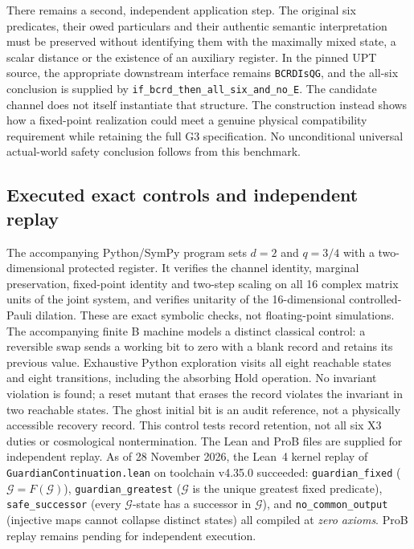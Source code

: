 \documentclass[11pt,a4paper]{article}
\begin{document}
There remains a second, independent application step. The original six predicates, their owed particulars and their authentic semantic interpretation must be preserved without identifying them with the maximally mixed state, a scalar distance or the existence of an auxiliary register. In the pinned UPT source, the appropriate downstream interface remains \texttt{BCRDIsQG}, and the all-six conclusion is supplied by \texttt{if\_bcrd\_then\_all\_six\_and\_no\_E}. The candidate channel does not itself instantiate that structure. The construction instead shows how a fixed-point realization could meet a genuine physical compatibility requirement while retaining the full G3 specification. No unconditional universal actual-world safety conclusion follows from this benchmark.

\subsection{Executed exact controls and independent replay}
The accompanying Python/SymPy program sets $d=2$ and $q=3/4$ with a two-dimensional protected register. It verifies the channel identity, marginal preservation, fixed-point identity and two-step scaling on all 16 complex matrix units of the joint system, and verifies unitarity of the 16-dimensional controlled-Pauli dilation. These are exact symbolic checks, not floating-point simulations. The accompanying finite B machine models a distinct classical control: a reversible swap sends a working bit to zero with a blank record and retains its previous value. Exhaustive Python exploration visits all eight reachable states and eight transitions, including the absorbing Hold operation. No invariant violation is found; a reset mutant that erases the record violates the invariant in two reachable states. The ghost initial bit is an audit reference, not a physically accessible recovery record. This control tests record retention, not all six X3 duties or cosmological nontermination. The Lean and ProB files are supplied for independent replay. As of 28 November 2026, the Lean~4 kernel replay of \texttt{GuardianContinuation.lean} on toolchain v4.35.0 succeeded: \texttt{guardian\_fixed} ($\mathcal{G}=F(\mathcal{G})$), \texttt{guardian\_greatest} ($\mathcal{G}$ is the unique greatest fixed predicate), \texttt{safe\_successor} (every $\mathcal{G}$-state has a successor in $\mathcal{G}$), and \texttt{no\_common\_output} (injective maps cannot collapse distinct states) all compiled at \emph{zero axioms}. ProB replay remains pending for independent execution.
\end{document}
